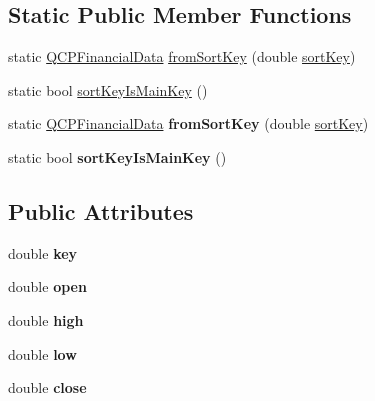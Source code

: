 \subsection*{Static Public Member Functions}
\begin{DoxyCompactItemize}
\item 
static \hyperlink{class_q_c_p_financial_data}{Q\+C\+P\+Financial\+Data} \hyperlink{class_q_c_p_financial_data_a54a0ca7ee7fd7713972477e8e2533ce5}{from\+Sort\+Key} (double \hyperlink{class_q_c_p_financial_data_a5e6f6218e3254119355b32d133b03e06}{sort\+Key})
\item 
static bool \hyperlink{class_q_c_p_financial_data_a1121db9420a7694144f6a99b09257a5f}{sort\+Key\+Is\+Main\+Key} ()
\item 
static \hyperlink{class_q_c_p_financial_data}{Q\+C\+P\+Financial\+Data} {\bfseries from\+Sort\+Key} (double \hyperlink{class_q_c_p_financial_data_a5e6f6218e3254119355b32d133b03e06}{sort\+Key})\hypertarget{class_q_c_p_financial_data_a54a0ca7ee7fd7713972477e8e2533ce5}{}\label{class_q_c_p_financial_data_a54a0ca7ee7fd7713972477e8e2533ce5}

\item 
static bool {\bfseries sort\+Key\+Is\+Main\+Key} ()\hypertarget{class_q_c_p_financial_data_a45c90527fd3cececeb41e47555333794}{}\label{class_q_c_p_financial_data_a45c90527fd3cececeb41e47555333794}

\end{DoxyCompactItemize}
\subsection*{Public Attributes}
\begin{DoxyCompactItemize}
\item 
double {\bfseries key}\hypertarget{class_q_c_p_financial_data_a18bc92126f28c214b05b0161e5f5958b}{}\label{class_q_c_p_financial_data_a18bc92126f28c214b05b0161e5f5958b}

\item 
double {\bfseries open}\hypertarget{class_q_c_p_financial_data_a3059e1e1fbcb9fd243fde0450f238032}{}\label{class_q_c_p_financial_data_a3059e1e1fbcb9fd243fde0450f238032}

\item 
double {\bfseries high}\hypertarget{class_q_c_p_financial_data_a299a4b241296fb6cd1baf5ab03f7126a}{}\label{class_q_c_p_financial_data_a299a4b241296fb6cd1baf5ab03f7126a}

\item 
double {\bfseries low}\hypertarget{class_q_c_p_financial_data_aecce0fb45a115e3f3a25eea78491ac16}{}\label{class_q_c_p_financial_data_aecce0fb45a115e3f3a25eea78491ac16}

\item 
double {\bfseries close}\hypertarget{class_q_c_p_financial_data_a45e9b96944c4a08ea6c82a72d3d22df2}{}\label{class_q_c_p_financial_data_a45e9b96944c4a08ea6c82a72d3d22df2}

\end{DoxyCompactItemize}


